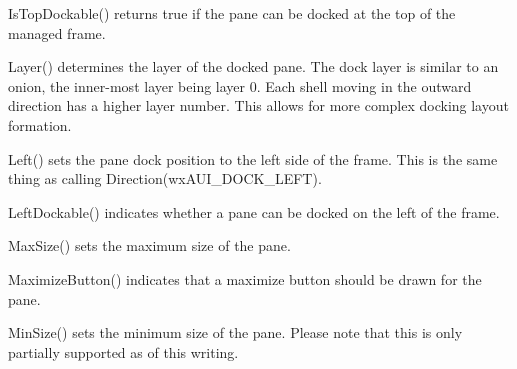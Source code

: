 \label{wxauipaneinfoistopdockable}


IsTopDockable() returns true if the pane can be docked at the top of the managed frame.

\label{wxauipaneinfolayer}


Layer() determines the layer of the docked pane.  The dock layer is similar to an onion, the inner-most layer being layer 0.  Each shell moving in the outward direction has a higher layer number.  This allows for more complex docking layout formation.

\label{wxauipaneinfoleft}


Left() sets the pane dock position to the left side of the frame.  This is the same thing as calling Direction(wxAUI_DOCK_LEFT).

\label{wxauipaneinfoleftdockable}


LeftDockable() indicates whether a pane can be docked on the left of the frame.

\label{wxauipaneinfomaxsize}


MaxSize() sets the maximum size of the pane.

\label{wxauipaneinfomaximizebutton}


MaximizeButton() indicates that a maximize button should be drawn for the pane.

\label{wxauipaneinfominsize}


MinSize() sets the minimum size of the pane.  Please note that this is only partially supported as of this writing.

